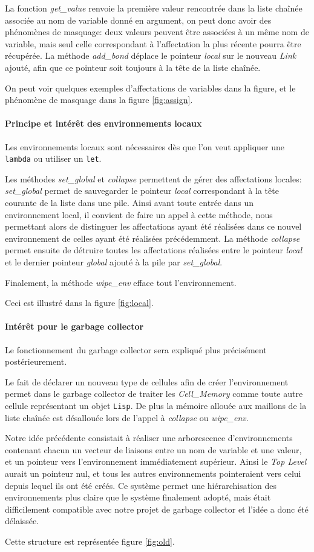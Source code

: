 La fonction \emph{get\_value} renvoie la première valeur rencontrée dans la
liste chaînée associée au nom de variable donné en argument, on peut donc avoir
des phénomènes de masquage: deux valeurs peuvent être associées à un même nom de
variable, mais seul celle correspondant à l'affectation la plus récente pourra
être récupérée. La méthode \emph{add\_bond} déplace le pointeur \emph{local} sur
le nouveau \emph{Link} ajouté, afin que ce pointeur soit toujours à la tête de
la liste chaînée.

On peut voir quelques exemples d'affectations de variables dans la figure, et le
phénomène de masquage dans la figure \ref{fig:assign}.

\paragraph{Principe et intérêt des environnements locaux}
Les environnements locaux sont nécessaires dès que l'on veut appliquer
une \texttt{lambda} ou utiliser un \texttt{let}.

Les méthodes \emph{set\_global} et \emph{collapse} permettent de gérer
des affectations locales: \emph{set\_global} permet de sauvegarder le
pointeur \emph{local} correspondant à la tête courante de la liste
dans une pile. Ainsi avant toute entrée dans un environnement local,
il convient de faire un appel à cette méthode, nous permettant alors
de distinguer les affectations ayant été réalisées dans ce nouvel
environnement de celles ayant été réalisées précédemment. La méthode
\emph{collapse} permet ensuite de détruire toutes les affectations
réalisées entre le pointeur \emph{local} et le dernier pointeur
\emph{global} ajouté à la pile par \emph{set\_global}.

Finalement, la méthode \emph{wipe\_env} efface tout l'environnement.

Ceci est illustré dans la figure \ref{fig:local}.

\paragraph{Intérêt pour le garbage collector}
Le fonctionnement du garbage collector sera expliqué plus précisément
postérieurement.

Le fait de déclarer un nouveau type de cellules afin de créer
l'environnement permet dans le garbage collector de traiter les
\emph{Cell\_Memory} comme toute autre cellule représentant un objet
\texttt{Lisp}. De plus la mémoire allouée aux maillons de la liste
chaînée est désallouée lors de l'appel à \emph{collapse} ou
\emph{wipe\_env}.

Notre idée précédente consistait à réaliser une arborescence
d'environnements contenant chacun un vecteur de liaisons entre un nom
de variable et une valeur, et un pointeur vers l'environnement
immédiatement supérieur. Ainsi le \emph{Top Level} aurait un pointeur
nul, et tous les autres environnements pointeraient vers celui depuis
lequel ils ont été créés. Ce système permet une hiérarchisation des
environnements plus claire que le système finalement adopté, mais
était difficilement compatible avec notre projet de garbage collector
et l'idée a donc été délaissée.

Cette structure est représentée figure \ref{fig:old}.
